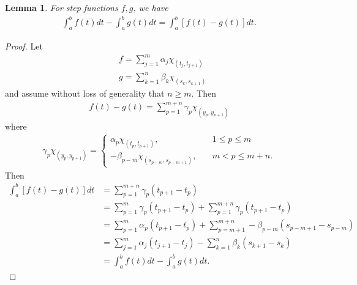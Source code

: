 \documentclass[12pt,reqno]{amsart}
\numberwithin{equation}{section}  %
\numberwithin{figure}{section}
\theoremstyle{plain}
\newtheorem{lemma}{Lemma}
\theoremstyle{definition}
\theoremstyle{remark}
\begin{document}
%
%
%
%
%
%
%
%
\begin{lemma}
For step functions $f, g$, we have
%
%
\begin{equation*}
\begin{split}
  \int_{a}^{b} f(t) dt - \int_{a}^{b} g(t) dt = \int_{a}^{b}\left[ f(t) - g(t) \right]dt.
\end{split}
\end{equation*}
%
%
\label{lem:indep-part}
\end{lemma}
%
%
\begin{proof}
%
Let
%
\begin{equation*}
\begin{split}
  & f = \sum_{j=1}^{m}\alpha_{j} \chi_{(t_{j}, t_{j+1})}
  \\
  & g = \sum_{k =1}^{n}
  \beta_{k} \chi_{(s_{k}, s_{k+1})}
\end{split}
\end{equation*}
%
and assume without loss of generality that $n \ge m$. 
Then
%
%
\begin{equation*}
\begin{split}
  f(t) - g(t) = \sum_{p=1}^{m+n} \gamma_{p} \chi_{(y_{p}, y_{p+1})} 
\end{split}
\end{equation*}
%
%
where
\begin{equation*}
  \begin{split}
    \gamma_{p} \chi_{(y_{p}, y_{p+1}) } = 
    \begin{cases}
      \alpha_{p} \chi_{(t_{p}, t_{p+1})}
, \quad & 1 \le p \le m \\
-\beta_{p-m} \chi_{(s_{p-m}, s_{p-m+1})}, \quad & m < p \le m+n.
\end{cases}
\end{split}
\end{equation*}
Then
%
%
%
\begin{equation*}
\begin{split}
  \int_{a}^{b}\left[ f(t) - g(t) \right]dt
  & = \sum_{p=1}^{m+n}
  \gamma_{p}(t_{p+1} - t_{p})
  \\
  & = \sum_{p=1}^{m} \gamma_{p}(t_{p+1} - t_{p}) +
  \sum_{p=1}^{m+n}\gamma_{p}(t_{p+1} - t_{p})
  \\
  & = \sum_{p=1}^{m} \alpha_{p}(t_{p+1} - t_{p}) +
  \sum_{p=m+1}^{m+n}-\beta_{p-m}(s_{p-m+1} - s_{p-m})
  \\
  & = \sum_{j=1}^{m}\alpha_{j}(t_{j+1} - t_{j}) -
  \sum_{k=1}^{n}\beta_{k}(s_{k+1} - s_{k})
  \\
  & = \int_{a}^{b}f(t)dt - \int_{a}^{b} g(t) dt.
\end{split}
\end{equation*}
%
%
%
%
\end{proof}
\end{document}
